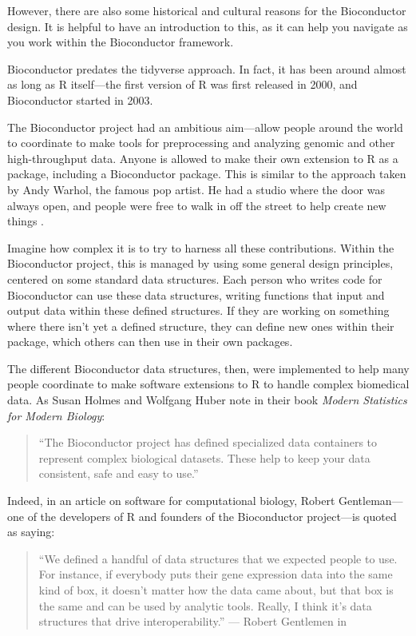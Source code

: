 \documentclass[]{tufte-book}
\begin{document}
However, there are also some historical and cultural reasons for the
Bioconductor design. It is helpful to have an introduction to this, as it
can help you navigate as you work within the Bioconductor framework.

Bioconductor predates the tidyverse approach. In fact, it has been around
almost as long as R itself---the first version of R was first released
in 2000, and Bioconductor started in 2003.

The Bioconductor project had an ambitious aim---allow people around the world to
coordinate to make tools for preprocessing and analyzing genomic and other
high-throughput data. Anyone is allowed to make their own extension to R as a
package, including a Bioconductor package. This is similar to the approach taken
by Andy Warhol, the famous pop artist. He had a studio where the door was always
open, and people were free to walk in off the street to help create new things
\citep{judkins2016art}.

Imagine how complex it is to try to harness all these contributions. Within
the Bioconductor project, this is managed by using some general design principles,
centered on some standard data structures. Each person who writes
code for Bioconductor can use these data structures, writing functions that
input and output data within these defined structures. If they are working
on something where there isn't yet a defined structure, they can define new
ones within their package, which others can then use in their own packages.

The different Bioconductor data structures, then, were implemented to help many
people coordinate to make software extensions to R to handle complex biomedical
data. As Susan Holmes and Wolfgang Huber note in their book \emph{Modern Statistics
for Modern Biology}:

\begin{quote}
``The Bioconductor project has defined specialized data containers to represent
complex biological datasets. These help to keep your data consistent, safe and
easy to use.'' \citep{holmes2018modern}
\end{quote}

Indeed, in an article on software for computational biology, Robert Gentleman---one
of the developers of R and founders of the Bioconductor project---is quoted
as saying:

\begin{quote}
``We defined a handful of data structures that we expected people to use. For
instance, if everybody puts their gene expression data into the same kind of
box, it doesn't matter how the data came about, but that box is the same and can
be used by analytic tools. Really, I think it's data structures that drive
interoperability.'' --- Robert Gentlemen in \citep{altschul2013anatomy}
\end{quote}
\end{document}
